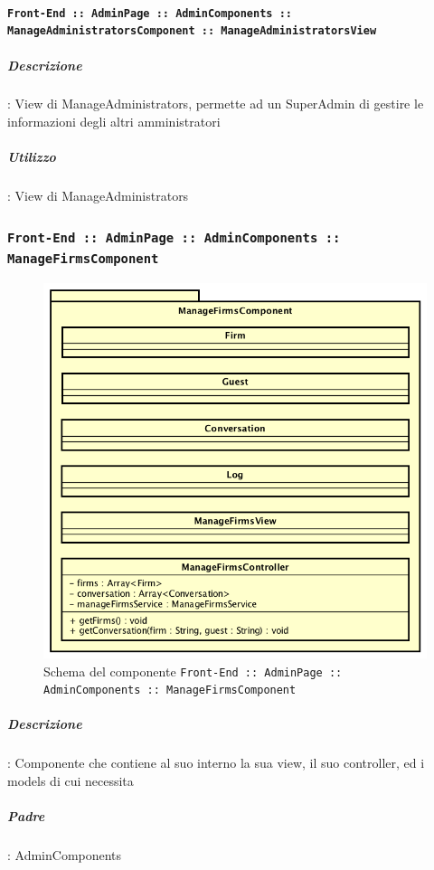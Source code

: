 \documentclass[../DefinizioneDiProdotto_v3.0.0.tex]{subfiles}
\begin{document}
				\paragraph{\texttt{Front-End :: AdminPage :: AdminComponents :: ManageAdministratorsComponent :: ManageAdministratorsView}}
					\subparagraph{Descrizione}: View di ManageAdministrators, permette ad un SuperAdmin di gestire le informazioni degli altri amministratori
					\subparagraph{Utilizzo}: View di ManageAdministrators

	\newpage
	\subsubsection{\texttt{Front-End :: AdminPage :: AdminComponents :: ManageFirmsComponent}}
	\begin{figure}[!h]
		\centering
		\includegraphics[scale=0.7]{Architettura/Front-End/AdminPage/AdminComponents/ManageFirmsComponent.png}
		\caption{Schema del componente \texttt{Front-End :: AdminPage :: AdminComponents :: ManageFirmsComponent}}
	\end{figure}

			\subparagraph{Descrizione}: Componente che contiene al suo interno la sua view, il suo controller, ed i models di cui necessita
			\subparagraph{Padre}: AdminComponents
\end{document}
